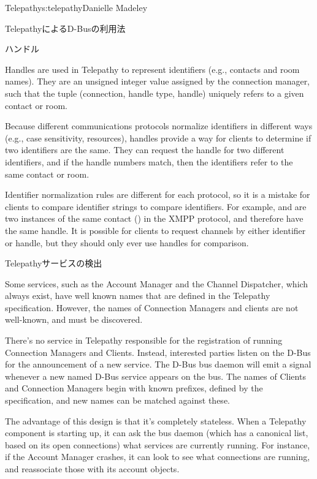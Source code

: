 \begin{aosachapter}{Telepathy}{s:telepathy}{Danielle Madeley}
\begin{aosasect1}{TelepathyによるD-Busの利用法}
\begin{aosasect2}{ハンドル}

Handles are used in Telepathy to represent identifiers (e.g., contacts
and room names). They are an unsigned integer value assigned by the
connection manager, such that the tuple (connection, handle type,
handle) uniquely refers to a given contact or room.

\pagebreak

Because different communications protocols normalize identifiers in
different ways (e.g., case sensitivity, resources), handles provide a
way for clients to determine if two identifiers are the same. They can
request the handle for two different identifiers, and if the handle
numbers match, then the identifiers refer to the same contact or room.

Identifier normalization rules are different for each protocol, so it
is a mistake for clients to compare identifier strings to compare
identifiers. For example,  and
 are two instances of the same
contact () in the XMPP protocol, and therefore
have the same handle. It is possible for clients to request channels
by either identifier or handle, but they should only ever use handles
for comparison.

\end{aosasect2}

\begin{aosasect2}{Telepathyサービスの検出}

Some services, such as the Account Manager and the Channel Dispatcher,
which always exist, have well known names that are defined in the
Telepathy specification. However, the names of Connection Managers and
clients are not well-known, and must be discovered.

There's no service in Telepathy responsible for the registration of
running Connection Managers and Clients. Instead, interested parties
listen on the D-Bus for the announcement of a new service.  The D-Bus
bus daemon will emit a signal whenever a new named D-Bus service
appears on the bus. The names of Clients and Connection Managers begin
with known prefixes, defined by the specification, and new names can
be matched against these.

The advantage of this design is that it's completely stateless. When a
Telepathy component is starting up, it can ask the bus daemon (which
has a canonical list, based on its open connections) what services are
currently running.  For instance, if the Account Manager crashes, it
can look to see what connections are running, and reassociate those
with its account objects.


\end{aosasect2}
\end{aosasect1}
\end{aosachapter}
